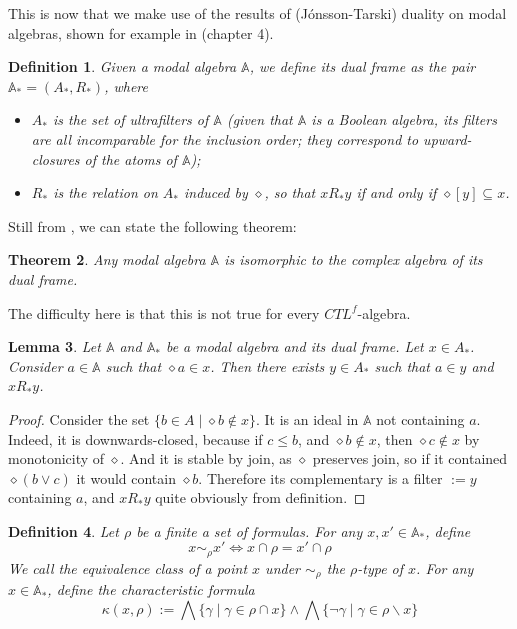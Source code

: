 \documentclass[11pt]{article}
\newcommand{\A}{{\mathbb A}}
\newtheorem{definition}{Definition}[section]
\newtheorem{theorem}[definition]{Theorem}
\newtheorem{lemma}[definition]{Lemma}
\begin{document}
This is now that we make use of the results of (J\'onsson-Tarski) duality on modal algebras, shown for example in \cite{GehvG22} (chapter 4).
\begin{definition}\label{dual_frame}
    Given a modal algebra $\A$, we define its \emph{dual frame} as the pair $\A_*=(A_*,R_*)$, where
    \begin{itemize}
        \item $A_*$ is the set of \emph{ultrafilters} of $\A$ (given that $\A$ is a Boolean algebra, its filters are all incomparable for the inclusion order; they correspond to upward-closures of the atoms of $\A$);
        \item $R_*$ is the relation on $A_*$ induced by $\diamond$, so that $xR_*y$ if and only if $\diamond [y]\subseteq x$.
    \end{itemize}
\end{definition}
Still from \cite{GehvG22}, we can state the following theorem:
\begin{theorem}\label{dual_modal_algebra}
    Any modal algebra $\A$ is isomorphic to the complex algebra of its dual frame.
\end{theorem}
The difficulty here is that this is not true for every $CTL^f$-algebra.
\begin{lemma}\label{exists_succ_R}
    Let $\A$ and $\A_*$ be a modal algebra and its dual frame. Let $x\in A_*$. Consider $a\in\A$ such that $\diamond a\in x$. Then there exists $y\in A_*$ such that $a\in y$ and $xR_*y$.
\end{lemma}
\begin{proof}
    Consider the set $\{b\in A\mid \diamond b\notin x\}$. It is an ideal in $\A$ not containing $a$. Indeed, it is downwards-closed, because if $c\leq b$, and $\diamond b \notin x$, then $\diamond c \notin x$ by monotonicity of $\diamond$. And it is stable by join, as $\diamond$ preserves join, so if it contained $\diamond(b\vee c)$ it would contain $\diamond b$. Therefore its complementary is a filter $:=y$ containing $a$, and $xR_*y$ quite obviously from definition.
\end{proof}
\begin{definition}\label{rho_equiv}
    Let $\rho$ be a finite a set of formulas. For any $x,x'\in \A_*$, define \[x\sim_\rho x' \Leftrightarrow x\cap\rho=x'\cap\rho\] We call the equivalence class of a point $x$ under $\sim_\rho$ the \emph{$\rho$-type of $x$}. For any $x\in \A_*$, define the \emph{characteristic formula} \[\kappa(x,\rho):=\bigwedge\{\gamma\mid\gamma\in\rho\cap x\}\wedge\bigwedge\{\neg\gamma\mid\gamma\in\rho\backslash x\}\]
\end{definition}
\end{document}
